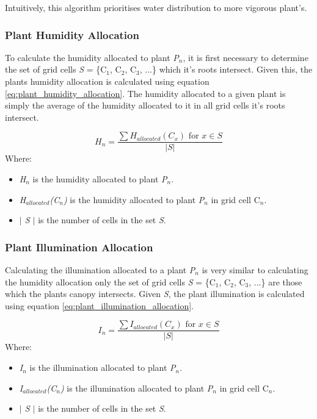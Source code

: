 Intuitively, this algorithm prioritises water distribution to more vigorous plant's.

\subsubsection{Plant Humidity Allocation}

To calculate the humidity allocated to plant \textit{P$_{n}$}, it is first necessary to determine the set of grid cells \textit{S} = \{C$_{1}$, C$_{2}$, C$_{3}$, ...\} which it's roots intersect. Given this, the plants humidity allocation is calculated using equation \ref{eq:plant_humidity_allocation}. The humidity allocated to a given plant is simply the average of the humidity allocated to it in all grid cells it's roots intersect.

\begin{equation}
H_{n} = \frac{\sum H_{allocated}(C_{x}) \text{ for } x \in S}{| S |}
\label{eq:plant_humidity_allocation}
\end{equation}
Where:
\begin{itemize}
\item \textit{H$_{n}$} is the humidity allocated to plant \textit{P$_{n}$}. 
\item \textit{H$_{allocated}$(C$_{n}$)} is the humidity allocated to plant \textit{P$_{n}$} in grid cell C$_{n}$.
\item \textit{$|$ S $|$} is the number of cells in the set \textit{S}.
\end{itemize}


\subsubsection{Plant Illumination Allocation}

Calculating the illumination allocated to a plant \textit{P$_{n}$} is very similar to calculating the humidity allocation only the set of grid cells \textit{S} = \{C$_{1}$, C$_{2}$, C$_{3}$, ...\} are those which the plants canopy intersects. Given \textit{S}, the plant illumination is calculated using equation \ref{eq:plant_illumination_allocation}.

\begin{equation}
I_{n} = \frac{\sum I_{allocated}(C_{x}) \text{ for } x \in S}{| S |}
\label{eq:plant_illumination_allocation}
\end{equation}
Where:
\begin{itemize}
\item \textit{I$_{n}$} is the illumination allocated to plant \textit{P$_{n}$}. 
\item \textit{I$_{allocated}$(C$_{n}$)} is the illumination allocated to plant \textit{P$_{n}$} in grid cell C$_{n}$.
\item \textit{$|$ S $|$ } is the number of cells in the set \textit{S}.
\end{itemize}

